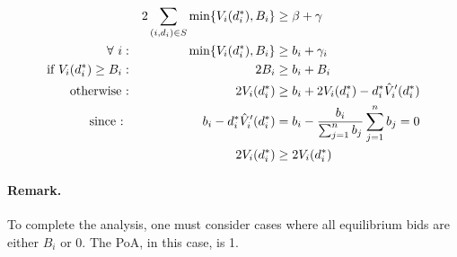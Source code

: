 \documentclass[11pt,a4paper]{article}
\begin{document}
\begin{align*}
	&& 2\sum_{(i,d_{i}) \in S} \min\{V_i(d_i^*), B_i \} &\ge \beta + \gamma\\
	\forall\ i : && \min\{V_i(d_i^*), B_i \} &\ge b_i + \gamma_i \\
	\textnormal{if } V_i(d_i^*) \ge B_i : && 2B_i &\ge b_i + B_i\\
	\textnormal{otherwise :} && 2 V_i(d_i^*) &\ge b_i + 2 V_{i}(d^{*}_{i}) - d^{*}_{i} \hat{V}'_{i}(d^{*}_{i})\\
	\textnormal{since : } && b_i - d^{*}_{i} \hat{V}'_{i}(d^{*}_{i}) &= b_i - \frac{b_i}{\sum_{j=1}^{n} b_j} \sum_{j=1}^{n} b_j = 0\\
	&& 2 V_{i}(d^{*}_{i}) &\ge 2 V_{i}(d^{*}_{i})
\end{align*}

\paragraph{Remark.} To complete the analysis, one must consider cases where all equilibrium bids are either $B_{i}$ or 0. The PoA, in this case, is 1.
\end{document}
